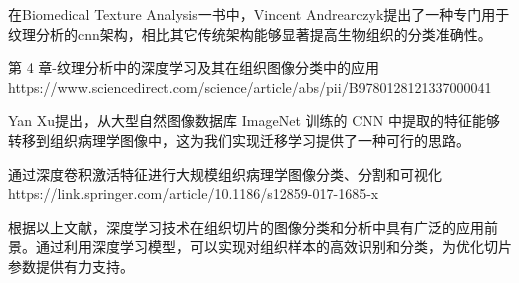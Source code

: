 在Biomedical Texture Analysis一书中，Vincent Andrearczyk提出了一种专门用于纹理分析的cnn架构，相比其它传统架构能够显著提高生物组织的分类准确性。

第 4 章-纹理分析中的深度学习及其在组织图像分类中的应用
https://www.sciencedirect.com/science/article/abs/pii/B9780128121337000041


Yan Xu提出，从大型自然图像数据库 ImageNet 训练的 CNN 中提取的特征能够转移到组织病理学图像中，这为我们实现迁移学习提供了一种可行的思路。

通过深度卷积激活特征进行大规模组织病理学图像分类、分割和可视化
https://link.springer.com/article/10.1186/s12859-017-1685-x

根据以上文献，深度学习技术在组织切片的图像分类和分析中具有广泛的应用前景。通过利用深度学习模型，可以实现对组织样本的高效识别和分类，为优化切片参数提供有力支持。





\FloatBarrier %








